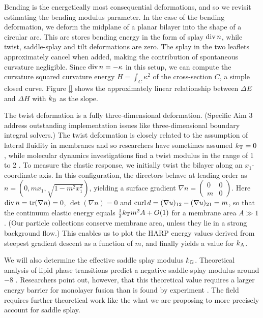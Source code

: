 Bending is the energetically most consequential deformations,
and so we revisit estimating the bending modulus parameter. 
In the case of the bending deformation, we deform the midplane of a planar bilayer into the shape of a circular arc.
This arc stores bending energy in the form of splay $\operatorname{div}{n}$, while twist, saddle-splay and tilt deformations are zero.
The splay in the two leaflets approximately cancel when added, making the contribution of spontaneous curvature negligible.
Since $\operatorname{div}{n} = -\kappa$ in this setup, we can compute the curvature squared curvature energy 
$H = \int_C \kappa^2$ of the cross-section $C$, a simple closed curve. Figure \ref{} shows the approximately linear
relationship between $\Delta E$ and $\Delta H$ with $k_{\mathrm{B}}$ as the slope.

The twist deformation is a fully three-dimensional deformation. 
(Specific Aim 3 address outstanding implementation issues like three-dimensional boundary integral solvers.) 
The twist deformation is closely related to the assumption of lateral fluidity in membranes and so researchers 
have sometimes assumed $k_{\mathrm{T}} = 0$ \cite{Hamm2000, TerziDeserno17, C9SM02079A, PhysRevE.102.042406}, 
while molecular dynamics investigations find a twist modulus in the range of 1 to 2 
\kBT \cite{LeVeWa14}.
To measure the elastic response,  we initially twist the bilayer along an $x_1$-coordinate axis.
In this configuration, the directors behave at leading order as $n = (0, mx_1, \sqrt{1 - m^2x_1^2})$,
yielding a surface gradient $\nabla n = \begin{pmatrix}0 & 0\\ m & 0\end{pmatrix}$. 
Here $\operatorname{div} n = \mathrm{tr}(\nabla n) = 0$, $\det(\nabla n) = 0$ and $\operatorname{curl} d = (\nabla u)_{12} - (\nabla u)_{21} = m$,
so that the continuum elastic energy equals $\tfrac{1}{2}k_{\mathrm{T}} m^2 A + O(1)$ for a membrane area $A \gg 1$. (Our particle collections
conserve membrane area, unless they lie in a strong background flow.) 
This enables us to plot the HARP energy values derived from steepest gradient descent as a function of $m$, and finally
yields a value for $k_{\mathrm{A}}$. 

We will also determine the effective saddle splay modulus $k_{\mathrm{G}}$. 
Theoretical analysis of lipid phase transitions predict a negative saddle-splay modulus around $-8$ \kBT\;
\cite{SIEGEL2004366,SIEGEL20085200}. Researchers point out, however, that this theoretical value requires a larger energy 
barrier for monolayer fusion than is found by experiment \cite{FrRoPi17,Tran7106,TerziDeserno17}. 
The field requires further theoretical work like the what we are proposing to more precisely account for saddle splay.
  
